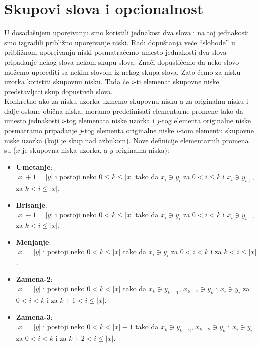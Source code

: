   \section{Skupovi slova i opcionalnost}
    U dosada\v{s}njem upore{\d}ivanju smo koristili jednakost dva slova i
    na toj je\-dnakosti smo izgradili pribli\v{z}no upore{\d}ivanje niski.
    Radi dopu\v{s}tanja ve\'ce ``slobode'' u pribli\v{z}nom upore{\d}ivanju
    niski posmatra\'cemo umesto jednakosti dva slova pripadanje nekog slova
    nekom skupu slova.
    Zna\v{c}i dopusti\'cemo da neko slovo mo\v{z}emo uporediti sa nekim slovom iz
    nekog skupa slova.
    Zato \'cemo za nisku uzorka koristiti skupovnu nisku.
    Tada \'ce $i$-ti elemenat skupovne niske predsta\-vljati skup dopustivih
    slova.\\
    Konkretno ako za nisku uzorka uzmemo skupovnu nisku a za originalnu
    nisku i dalje ostane obi\v{c}na niska, moramo predefinisati
    elementarne promene tako da umesto jednakosti $i$-tog elemenata
    niske uzorka i $j$-tog elementa originalne niske posmatramo
    pripadanje $j$-tog elementa originalne niske $i$-tom elementu
    skupovne niske uzorka (koji je skup nad azbukom).
    Nove definicije elementarnih promena su ($x$ je skupovna niska uzorka,
    a $y$ originalna niska):
    \begin{itemize}
      \item
        {\bf Umetanje}:\\
        $|x|+1=|y|$ i postoji neko $0\le k\le |x|$ tako da $x_i\ni y_i$ za
        $0<i\le k$ i $x_i\ni y_{i+1}$ za $k< i\le|x|$.\\
      \item
        {\bf Brisanje}:\\
        $|x|-1=|y|$ i postoji neko $0< k\le|x|$ tako da $x_i\ni y_i$ za
        $0<i<k$ i $x_i\ni y_{i-1}$ za $k<i\le|x|$.\\
      \item
        {\bf Menjanje}:\\
        $|x|=|y|$ i postoji neko $0<k\le|x|$ tako da $x_i\ni y_i$ za
        $0<i<k$ i za $k<i\le|x|$.\\
      \item
        {\bf Zamena-2}:\\
        $|x|=|y|$ i postoji neko $0<k<|x|$ tako da $x_k\ni y_{k+1}$,
        $x_{k+1}\ni y_k$ i $x_i\ni y_i$ za $0<i<k$ i za $k+1<i\le|x|$.\\
      \item
        {\bf Zamena-3}:\\
        $|x|=|y|$ i postoji neko $0<k<|x|-1$ tako da $x_k\ni y_{k+2}$,
        $x_{k+2}\ni y_k$ i $x_i\ni y_i$ za $0<i<k$ i za $k+2<i\le|x|$.\\
    \end{itemize}
